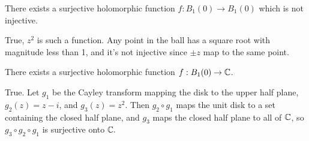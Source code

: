 \documentclass{homework}
\begin{document}
                                                                                                                                \begin{problem}
                                                                                                                                  There exists a surjective holomorphic function
                                                                                                                                    $f : B_1(0) \to B_1(0)$ which is not injective.
                                                                                                                                    \end{problem}
                                                                                                                                    \begin{solution}
                                                                                                                                    True, $z^2$ is such a function. Any point in the ball has a square root with magnitude less than 1, and it's not injective since $\pm z$ map to the same point.
                                                                                                                                    \end{solution}
                                                                                                                                    \begin{problem}
                                                                                                                                      There exists a surjective holomorphic function $f : B_1(0) \to \mathbb{C}$.
                                                                                                                                      \end{problem}
                                                                                                                                      \begin{solution}
                                                                                                                                      True. Let $g_1$ be the Cayley transform mapping the disk to the upper half plane, $g_2(z) = z-i$, and $g_3(z) = z^2.$ Then $g_2\circ g_1$ maps the unit disk to a set containing the closed half plane, and $g_3$ maps the closed half plane to all of $\mathbb{C}$, so $g_3\circ g_2 \circ g_1$ is surjective onto $\mathbb{C}.$
                                                                                                                                      \end{solution}
                                                                                                                                      
\end{document}
